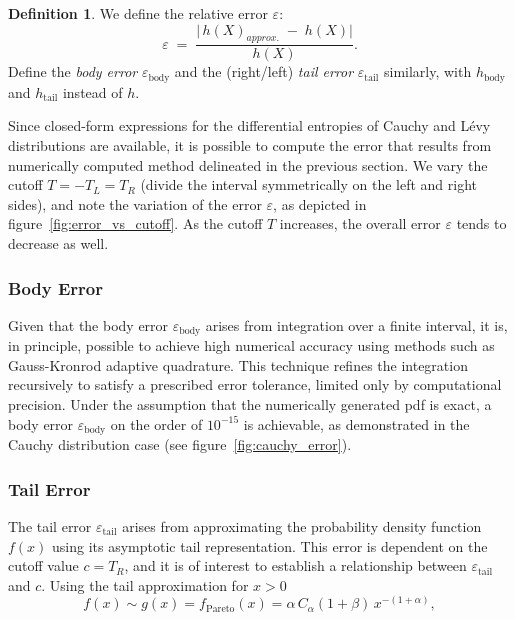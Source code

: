 \documentclass{article}
\theoremstyle{definition}
\newtheorem{definition}{Definition}[section]
\begin{document}
\begin{definition}
We define the relative error $\varepsilon$:
\[
\varepsilon
\;=\;
\frac{\bigl|\,h({X})_{approx.} \;-\; h(X)\bigr|}{h(X)}.
\]
Define the \emph{body error} \(\varepsilon_{\mathrm{body}}\) and the (right/left) \emph{tail error} \(\varepsilon_{\mathrm{tail}}\) similarly, with $h_\mathrm{body}$ and $h_\mathrm{tail}$ instead of \(h\).
\end{definition}

Since closed-form expressions for the differential entropies of Cauchy and L\'evy distributions are available, it is possible to compute the error that results from numerically computed method delineated in the previous section. We vary the cutoff \(T=-T_L=T_R\) (divide the interval symmetrically on the left and right sides), and note the variation of the error \(\varepsilon\), as depicted in figure~\ref{fig:error_vs_cutoff}. As the cutoff \(T\) increases, the overall error \(\varepsilon\) tends to decrease as well.


\subsubsection{Body Error}
Given that the body error $\varepsilon_\mathrm{body}$ arises from integration over a finite interval, it is, in principle, possible to achieve high numerical accuracy using methods such as Gauss-Kronrod adaptive quadrature. This technique refines the integration recursively to satisfy a prescribed error tolerance, limited only by computational precision. Under the assumption that the numerically generated pdf is exact, a body error \( \varepsilon_\mathrm{body} \) on the order of \( 10^{-15} \) is achievable, as demonstrated in the Cauchy distribution case (see figure~\ref{fig:cauchy_error}).


\subsubsection{Tail Error}
The tail error \( \varepsilon_\mathrm{tail} \) arises from approximating the probability density function \( f(x) \) using its asymptotic tail representation. This error is dependent on the cutoff value \( c=T_R \), and it is of interest to establish a relationship between \( \varepsilon_\mathrm{tail} \) and \( c \).
Using the tail approximation for $x > 0$
\begin{equation*}
f(x) \sim g(x)=f_{\mathrm{Pareto}}(x)
= \alpha\,C_\alpha(1+\beta)\,x^{-(1+\alpha)},
\end{equation*}
\end{document}

